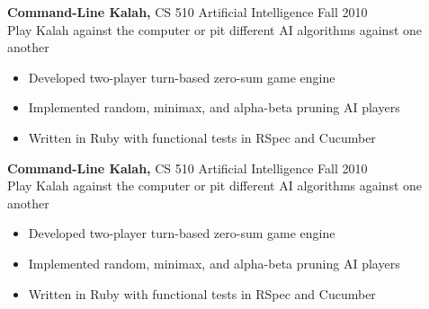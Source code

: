 \documentclass[margin]{res}
\begin{document}
\begin{resume}
\begin{software}
{\bf Command-Line Kalah,} CS 510 Artificial Intelligence \hfill  Fall 2010 \\
Play Kalah against the computer or pit different AI algorithms against one another
\begin{itemize} \itemsep -2pt %
\item Developed two-player turn-based zero-sum game engine
\item Implemented random, minimax, and alpha-beta pruning AI players 
\item Written in Ruby with functional tests in RSpec and Cucumber
\end{itemize}
\end{software}
\begin{controls}
{\bf Command-Line Kalah,} CS 510 Artificial Intelligence \hfill  Fall 2010 \\
Play Kalah against the computer or pit different AI algorithms against one another
\begin{itemize} \itemsep -2pt %
\item Developed two-player turn-based zero-sum game engine
\item Implemented random, minimax, and alpha-beta pruning AI players 
\item Written in Ruby with functional tests in RSpec and Cucumber
\end{itemize}
\end{controls}


\end{resume}
\end{document}

